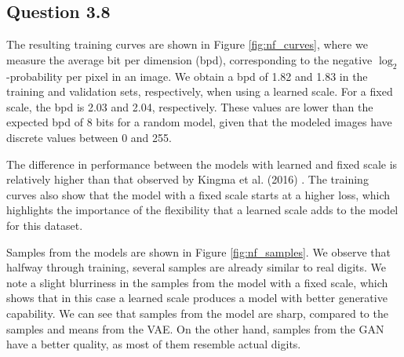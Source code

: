 \documentclass{article}
\begin{document}
\subsection*{Question 3.8}

The resulting training curves are shown in Figure \ref{fig:nf_curves}, where we measure the average bit per dimension (bpd), corresponding to the negative $\log_2$-probability per pixel in an image. We obtain a bpd of 1.82 and 1.83 in the training and validation sets, respectively, when using a learned scale. For a fixed scale, the bpd is 2.03 and 2.04, respectively. These values are lower than the expected bpd of 8 bits for a random model, given that the modeled images have discrete values between 0 and 255.

The difference in performance between the models with learned and fixed scale is relatively higher than that observed by Kingma et al. (2016) \cite{kingma2016improved}. The training curves also show that the model with a fixed scale starts at a higher loss, which highlights the importance of the flexibility that a learned scale adds to the model for this dataset.


Samples from the models are shown in Figure \ref{fig:nf_samples}. We observe that halfway through training, several samples are already similar to real digits. We note a slight blurriness in the samples from the model with a fixed scale, which shows that in this case a learned scale produces a model with better generative capability. We can see that samples from the model are sharp, compared to the samples and means from the VAE. On the other hand, samples from the GAN have a better quality, as most of them resemble actual digits.
 
\end{document}

